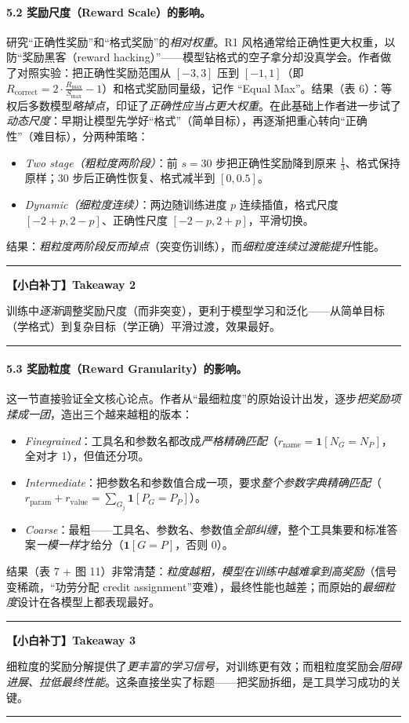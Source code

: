 \documentclass[11pt,UTF8,fontset=fandol]{ctexart}
\newenvironment{tip}[1]{%
  \par\smallskip\noindent\rule{\linewidth}{0.4pt}\par\nobreak
  \noindent\textbf{【小白补丁】#1}\par\nobreak\noindent\ignorespaces
}{%
  \par\noindent\rule{\linewidth}{0.4pt}\par\smallskip
}
\begin{document}
\paragraph{5.2 奖励尺度（Reward Scale）的影响。}研究“正确性奖励”和“格式奖励”的\emph{相对权重}。R1 风格通常给正确性更大权重，以防“奖励黑客（reward hacking）”——模型钻格式的空子拿分却没真学会。作者做了对照实验：把正确性奖励范围从 $[-3,3]$ 压到 $[-1,1]$（即 $R_{\text{correct}}=2\cdot\frac{R_{\max}}{S_{\max}}-1$）和格式奖励同量级，记作 “Equal Max”。结果（表 6）：等权后多数模型\emph{略掉点}，印证了\emph{正确性应当占更大权重}。在此基础上作者进一步试了\emph{动态尺度}：早期让模型先学好“格式”（简单目标），再逐渐把重心转向“正确性”（难目标），分两种策略：
\begin{itemize}[leftmargin=1.5em]
\item \emph{Two stage（粗粒度两阶段）}：前 $s=30$ 步把正确性奖励降到原来 $\tfrac13$、格式保持原样；30 步后正确性恢复、格式减半到 $[0,0.5]$。
\item \emph{Dynamic（细粒度连续）}：两边随训练进度 $p$ 连续插值，格式尺度 $[-2+p,2-p]$、正确性尺度 $[-2-p,2+p]$，平滑切换。
\end{itemize}
结果：\emph{粗粒度两阶段反而掉点}（突变伤训练），而\emph{细粒度连续过渡能提升}性能。
\begin{tip}{Takeaway 2}
训练中\emph{逐渐}调整奖励尺度（而非突变），更利于模型学习和泛化——从简单目标（学格式）到复杂目标（学正确）平滑过渡，效果最好。
\end{tip}

\paragraph{5.3 奖励粒度（Reward Granularity）的影响。}这一节直接验证全文核心论点。作者从“最细粒度”的原始设计出发，逐步\emph{把奖励项揉成一团}，造出三个越来越粗的版本：
\begin{itemize}[leftmargin=1.5em]
\item \emph{Finegrained}：工具名和参数名都改成\emph{严格精确匹配}（$r_{\text{name}}=\mathbf{1}[N_G=N_P]$，全对才 1），但值还分项。
\item \emph{Intermediate}：把参数名和参数值合成一项，要求\emph{整个参数字典精确匹配}（$r_{\text{param}}+r_{\text{value}}=\sum_{G_j}\mathbf{1}[P_G=P_P]$）。
\item \emph{Coarse}：最粗——工具名、参数名、参数值\emph{全部纠缠}，整个工具集要和标准答案\emph{一模一样}才给分（$\mathbf{1}[G=P]$，否则 0）。
\end{itemize}
结果（表 7 + 图 11）非常清楚：\emph{粒度越粗，模型在训练中越难拿到高奖励}（信号变稀疏，“功劳分配 credit assignment”变难），最终性能也越差；而原始的\emph{最细粒度}设计在各模型上都表现最好。
\begin{tip}{Takeaway 3}
细粒度的奖励分解提供了\emph{更丰富的学习信号}，对训练更有效；而粗粒度奖励会\emph{阻碍进展、拉低最终性能}。这条直接坐实了标题——把奖励拆细，是工具学习成功的关键。
\end{tip}
\end{document}
